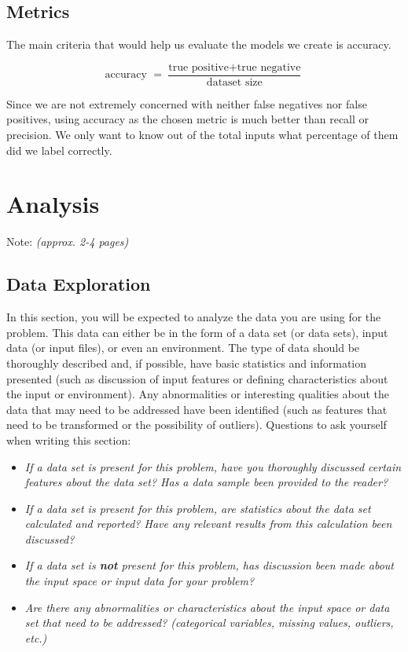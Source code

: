\documentclass{article}
\begin{document}
\subsection{Metrics}\label{metrics}

The main criteria that would help us evaluate the models we create is
accuracy.

\[ 
  \text{accuracy $=\frac{\text{true positive} + \text{true negative}}{\text{dataset size}}$}
\]

Since we are not extremely concerned with neither false negatives nor false positives,
using accuracy as the chosen metric is much better than recall or precision.
We only want to know out of the total inputs what percentage of them did we label correctly.

\section{Analysis}

Note: \emph{(approx. 2-4 pages)}

\subsection{Data Exploration}\label{data-exploration}

In this section, you will be expected to analyze the data you are using
for the problem. This data can either be in the form of a data set (or
data sets), input data (or input files), or even an environment. The
type of data should be thoroughly described and, if possible, have basic
statistics and information presented (such as discussion of input
features or defining characteristics about the input or environment).
Any abnormalities or interesting qualities about the data that may need
to be addressed have been identified (such as features that need to be
transformed or the possibility of outliers). Questions to ask yourself
when writing this section:

\begin{itemize}
\item
  \emph{If a data set is present for this problem, have you thoroughly
  discussed certain features about the data set? Has a data sample been
  provided to the reader?}
\item
  \emph{If a data set is present for this problem, are statistics about
  the data set calculated and reported? Have any relevant results from
  this calculation been discussed?}
\item
  \emph{If a data set is \textbf{not} present for this problem, has
  discussion been made about the input space or input data for your
  problem?}
\item
  \emph{Are there any abnormalities or characteristics about the input
  space or data set that need to be addressed? (categorical variables,
  missing values, outliers, etc.)}
\end{itemize}
\end{document}
